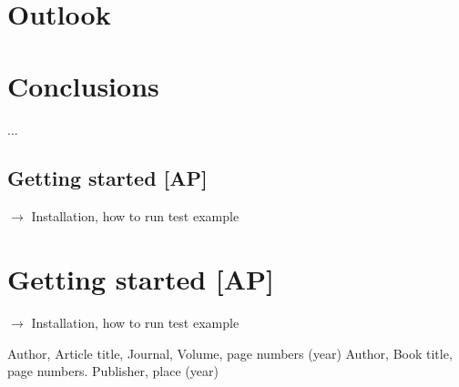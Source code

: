 \section{Outlook}
\label{out}


\section{Conclusions}
\label{conc}


\begin{acknowledgements}
...
\end{acknowledgements}


\begin{appendix}




\section{Getting started {\bf [AP]}}
\label{code_init}

$\to$ Installation, how to run test example







\end{appendix}


\appendix
\label{}

\section{Getting started  {\bf [AP]}}
\label{code_init}

$\to$ Installation, how to run test example



\begin{thebibliography}{}
%
%
Author, Article title, Journal, Volume, page numbers (year)
Author, Book title, page numbers. Publisher, place (year)
\end{thebibliography}



